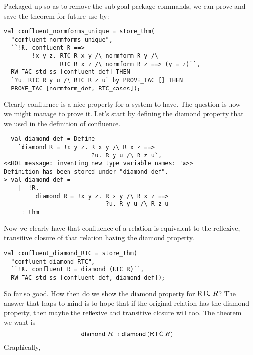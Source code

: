 Packaged up so as to remove the sub-goal package commands, we can
prove and save the theorem for future use by:
\begin{session}\begin{verbatim}
val confluent_normforms_unique = store_thm(
  "confluent_normforms_unique",
  ``!R. confluent R ==>
        !x y z. RTC R x y /\ normform R y /\
                RTC R x z /\ normform R z ==> (y = z)``,
  RW_TAC std_ss [confluent_def] THEN
  `?u. RTC R y u /\ RTC R z u` by PROVE_TAC [] THEN
  PROVE_TAC [normform_def, RTC_cases]);
\end{verbatim}\end{session}
\eos{}

Clearly confluence is a nice property for a system to have.  The
question is how we might manage to prove it.  Let's start by defining
the diamond property that we used in the definition of confluence.
\begin{session}\begin{verbatim}
- val diamond_def = Define
    `diamond R = !x y z. R x y /\ R x z ==>
                         ?u. R y u /\ R z u`;
<<HOL message: inventing new type variable names: 'a>>
Definition has been stored under "diamond_def".
> val diamond_def =
    |- !R.
         diamond R = !x y z. R x y /\ R x z ==>
                             ?u. R y u /\ R z u
     : thm
\end{verbatim}\end{session}
    Now we clearly have that confluence of a relation is equivalent to
    the reflexive, transitive closure of that relation having the
    diamond property.
\begin{session}\begin{verbatim}
val confluent_diamond_RTC = store_thm(
  "confluent_diamond_RTC",
  ``!R. confluent R = diamond (RTC R)``,
  RW_TAC std_ss [confluent_def, diamond_def]);
\end{verbatim}\end{session}
    So far so good.  How then do we show the diamond property for
    ${\sf RTC}\;R$?  The answer that leaps to mind is to hope that if
    the original relation has the diamond property, then maybe the
    reflexive and transitive closure will too.  The theorem we want is
    \[ {\sf diamond}\;R \supset {\sf diamond}\,({\sf RTC}\;R)\] Graphically,
